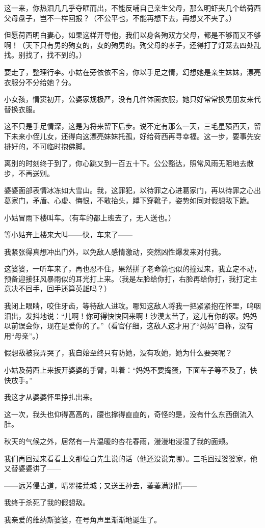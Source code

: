 \par 这一来，你热泪几几乎夺眶而出，不能反哺自己亲生父母，那么明虾夹几个给荷西父母盘子，岂不一样回报？（不公平也，不能再想下去，再想又不夹了。）
\par 但愿荷西明白妻心，如果这样开导他，我们以身各殉双方父母，都是不够而又不够啊！（天下只有男的殉女的，女的殉男的。殉父母的孝子，还得打了灯笼去四处乱找。别找了，找不到的。）
\par 要走了，整理行李。小姑在旁依依不舍，你以手足之情，幻想她是亲生妹妹，漂亮衣服分不分给她？分。
\par 小女孩，情窦初开，公婆家规极严，没有几件体面衣服，她只好常常换男朋友来代替换衣服。
\par 这不只是手足情深，这是为将来留下后步。说不定有那么一天，三毛星殒西天，留下未来小侄儿女，还得向这漂亮妹妹托孤，好给荷西再寻幸福。这一步，要事先安排好的，不可临时抱佛脚。
\par 离别的时刻终于到了，你心跳又到一百五十下。公公豁达，照常风雨无阻地去散步，不再送别。
\par 婆婆面部表情冰冻如大雪山。我，这罪犯，以待罪之心进葛家门，再以待罪之心出葛家门，矛盾、心虚、悔恨，不敢抬头，蹲下穿靴子，姿势如同对假想敌下跪。
\par 小姑冒雨下楼叫车。（有车的都上班去了，无人送也。）
\par 等小姑奔上楼来大叫——快，车来了——
\par 我紧张得真想冲出门外，以免敌人感情激动，突然凶性爆发来对付我。
\par 这婆婆，一听车来了，再也忍不住，果然拼了老命箭也似的撞过来，我立定不动，预备迎接狂风暴雨似的耳光打上来。（我是左脸给你打，右脸再给你打，我打定主意决不回手，回手还算英雄吗？）
\par 我闭上眼睛，咬住牙齿，等待敌人进攻。哪知这敌人将我一把紧紧抱在怀里，呜咽泪出，发抖地说：“儿啊！你可得快快回来啊！沙漠太苦了，这儿有你的家。妈妈以前误会你，现在是爱你的了。”（看官仔细，这敌人这才用了“妈妈”自称，没有用“母亲”。）
\par 假想敌被我弄哭了，我自始至终只有防她，没有攻她，她为什么要哭呢？
\par 小姑及荷西上来扳开婆婆的手臂，叫着：“妈妈不要捣蛋，下面车子等不及了，快快放手。”
\par 我这才从婆婆怀里挣扎出来。
\par 这一次，我头也仰得高高的，腰也撑得直直的，奇怪的是，没有什么东西倒流入肚。
\par 秋天的气候之外，居然有一片温暖的杏花春雨，漫漫地浸湿了我的面颊。
\par 我们再回过来看看上文那位白先生说的话（他还没说完哪）。三毛回过婆婆家，他又替婆婆讲了——
\par ——远芳侵古道，晴翠接荒城；又送王孙去，萋萋满别情——
\par 我终于杀死了我的假想敌。
\par 我亲爱的维纳斯婆婆，在号角声里渐渐地诞生了。


